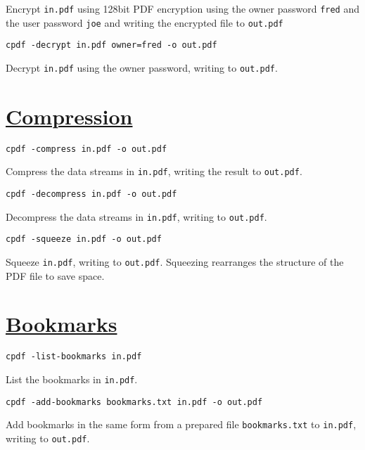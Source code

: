 \documentclass{book}
\begin{document}
\noindent Encrypt \texttt{in.pdf} using 128bit PDF encryption using the owner password \texttt{fred} and the user password \texttt{joe} and writing the encrypted file to \texttt{out.pdf}

\begin{framed}\noindent\texttt{cpdf -decrypt in.pdf owner=fred -o out.pdf}\end{framed}

\noindent Decrypt \texttt{in.pdf} using the owner password, writing to \texttt{out.pdf}.


\section*{\hyperref[chap:5]{Compression}}

\begin{framed}\noindent\texttt{cpdf -compress in.pdf -o out.pdf}\end{framed}

\noindent Compress the data streams in \texttt{in.pdf}, writing the result to \texttt{out.pdf}.

\begin{framed}\noindent\texttt{cpdf -decompress in.pdf -o out.pdf}\end{framed}

\noindent Decompress the data streams in \texttt{in.pdf}, writing to \texttt{out.pdf}.

\begin{framed}\noindent\texttt{cpdf -squeeze in.pdf -o out.pdf}\end{framed}

\noindent Squeeze \texttt{in.pdf}, writing to \texttt{out.pdf}. Squeezing rearranges the structure of the PDF file to save space.


\section*{\hyperref[chap:6]{Bookmarks}}

\begin{framed}\noindent\texttt{cpdf -list-bookmarks in.pdf}\end{framed}

\noindent List the bookmarks in \texttt{in.pdf}. 

\begin{framed}\noindent\texttt{cpdf -add-bookmarks bookmarks.txt in.pdf -o out.pdf}\end{framed}

\noindent Add bookmarks in the same form from a prepared file \texttt{bookmarks.txt} to \texttt{in.pdf}, writing to \texttt{out.pdf}.
\end{document}
